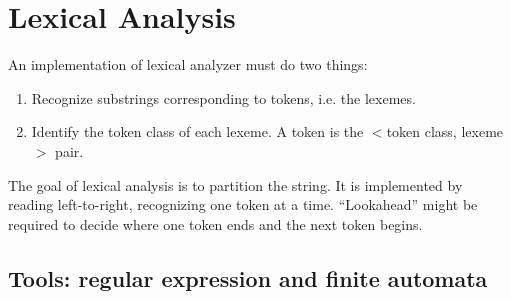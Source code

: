\ifx\PREAMBLE\undefined


\fi
\chapter{Lexical Analysis}
An implementation of lexical analyzer must do two things:
\begin{enumerate}
\item Recognize substrings corresponding to tokens, i.e. the lexemes.
\item Identify the token class of each lexeme. A token is the $<$token class, lexeme$>$ pair.
\end{enumerate} 
The goal of lexical analysis is to partition the string. It is implemented by reading left-to-right, recognizing one token at a time. ``Lookahead'' might be required to decide where one token ends and the next token begins.
\section{Tools: regular expression and finite automata}
